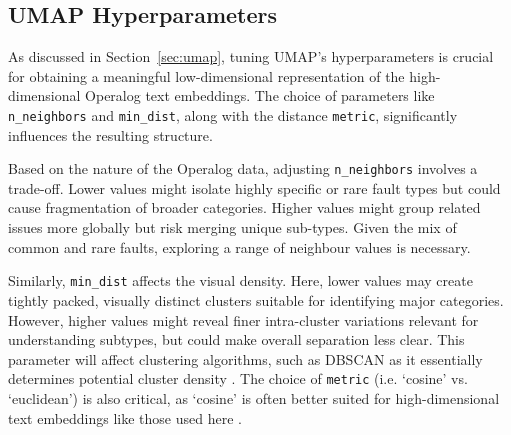 \documentclass[10pt,oneside]{report}
\begin{document}
\subsection{UMAP Hyperparameters}\label{sec:umaphyperparameters}

%
%


As discussed in Section~\ref{sec:umap}, %
tuning UMAP's hyperparameters is crucial for obtaining a meaningful low-dimensional representation of the high-dimensional Operalog text embeddings. The choice of parameters like \texttt{n\_neighbors} and \texttt{min\_dist}, along with the distance \texttt{metric}, significantly influences the resulting structure.

Based on the nature of the Operalog data, adjusting \texttt{n\_neighbors} involves a trade-off. Lower values might isolate highly specific or rare fault types but could cause fragmentation of broader categories. Higher values might group related issues more globally but risk merging unique sub-types. Given the mix of common and rare faults, exploring a range of neighbour values is necessary. 

Similarly, \texttt{min\_dist} affects the visual density. Here, lower values may create tightly packed, visually distinct clusters suitable for identifying major categories. However, higher values might reveal finer intra-cluster variations relevant for understanding subtypes, but could make overall separation less clear. This parameter will affect clustering algorithms, such as DBSCAN as it essentially determines potential cluster density \cite{ester1996density}.
The choice of \texttt{metric} (i.e. `cosine' vs. `euclidean') is also critical, as `cosine' is often better suited for high-dimensional text embeddings like those used here \cite{baba2017plagiarism, cao2024recent}.
\end{document}
